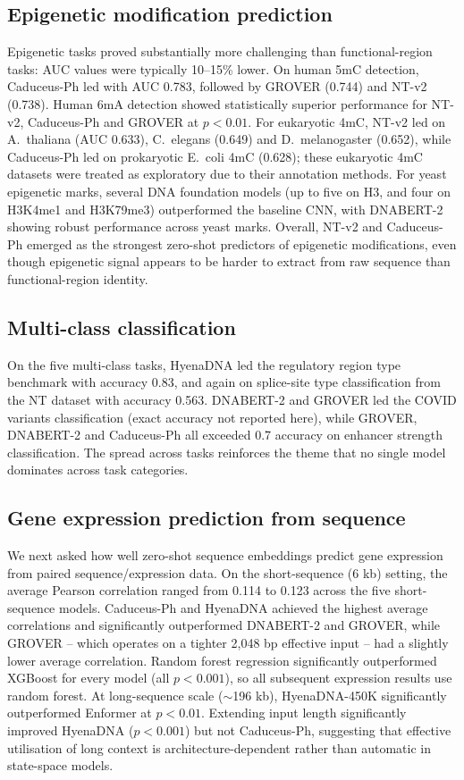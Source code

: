 \documentclass[11pt,a4paper]{article}
\begin{document}
\subsection{Epigenetic modification prediction}
Epigenetic tasks proved substantially more challenging than functional-region tasks: AUC values were typically 10--15\% lower. On human 5mC detection, Caduceus-Ph led with AUC 0.783, followed by GROVER (0.744) and NT-v2 (0.738). Human 6mA detection showed statistically superior performance for NT-v2, Caduceus-Ph and GROVER at $p < 0.01$. For eukaryotic 4mC, NT-v2 led on A.~thaliana (AUC 0.633), C.~elegans (0.649) and D.~melanogaster (0.652), while Caduceus-Ph led on prokaryotic E.~coli 4mC (0.628); these eukaryotic 4mC datasets were treated as exploratory due to their annotation methods. For yeast epigenetic marks, several DNA foundation models (up to five on H3, and four on H3K4me1 and H3K79me3) outperformed the baseline CNN, with DNABERT-2 showing robust performance across yeast marks. Overall, NT-v2 and Caduceus-Ph emerged as the strongest zero-shot predictors of epigenetic modifications, even though epigenetic signal appears to be harder to extract from raw sequence than functional-region identity.

\subsection{Multi-class classification}
On the five multi-class tasks, HyenaDNA led the regulatory region type benchmark with accuracy 0.83, and again on splice-site type classification from the NT dataset with accuracy 0.563. DNABERT-2 and GROVER led the COVID variants classification (exact accuracy not reported here), while GROVER, DNABERT-2 and Caduceus-Ph all exceeded 0.7 accuracy on enhancer strength classification. The spread across tasks reinforces the theme that no single model dominates across task categories.

\subsection{Gene expression prediction from sequence}
We next asked how well zero-shot sequence embeddings predict gene expression from paired sequence/expression data. On the short-sequence (6 kb) setting, the average Pearson correlation ranged from 0.114 to 0.123 across the five short-sequence models. Caduceus-Ph and HyenaDNA achieved the highest average correlations and significantly outperformed DNABERT-2 and GROVER, while GROVER -- which operates on a tighter 2{,}048 bp effective input -- had a slightly lower average correlation. Random forest regression significantly outperformed XGBoost for every model (all $p < 0.001$), so all subsequent expression results use random forest. At long-sequence scale ($\sim$196 kb), HyenaDNA-450K significantly outperformed Enformer at $p < 0.01$. Extending input length significantly improved HyenaDNA ($p < 0.001$) but not Caduceus-Ph, suggesting that effective utilisation of long context is architecture-dependent rather than automatic in state-space models.
\end{document}
